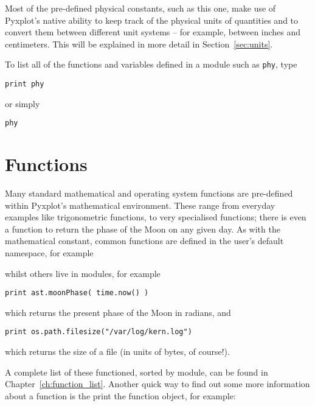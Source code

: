 Most of the pre-defined physical constants, such as this one, make use of
Pyxplot's native ability to keep track of the physical units of quantities and
to convert them between different unit systems -- for example, between inches
and centimeters.  This will be explained in more detail in
Section~\ref{sec:units}.

To list all of the functions and variables defined in a module such as {\tt phy}, type

\begin{verbatim}
print phy
\end{verbatim}

\noindent or simply

\begin{verbatim}
phy
\end{verbatim}


\section{Functions} \label{sec:functions}

Many standard mathematical and operating system functions are pre-defined
within Pyxplot's mathematical environment. These range from everyday examples
like trigonometric functions, to very specialised functions; there is even a
function to return the phase of the Moon on any given day. As with the
mathematical constant, common functions are defined in the user's default
namespace, for example

\vspace{3mm}

\vspace{3mm}

\noindent whilst others live in modules, for example

\begin{verbatim}
print ast.moonPhase( time.now() )
\end{verbatim}

\noindent which returns the present phase of the Moon in radians, and

\begin{verbatim}
print os.path.filesize("/var/log/kern.log")
\end{verbatim}

\noindent which returns the size of a file (in units of bytes, of course!).

A complete list of these functioned, sorted by module, can be found in
Chapter~\ref{ch:function_list}.  Another quick way to find out some more
information about a function is the print the function object, for example:

